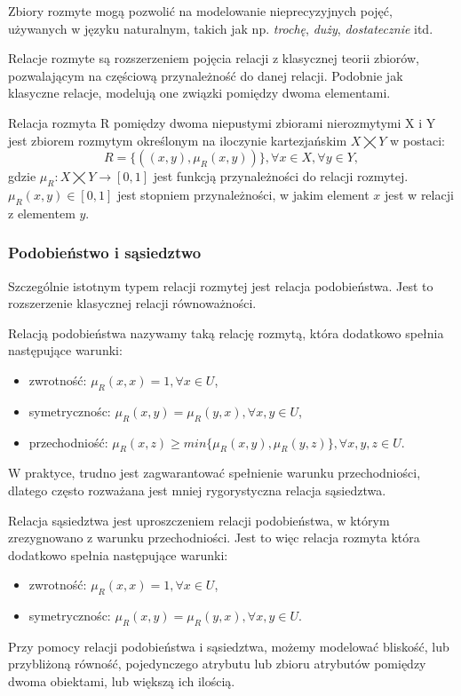 \documentclass{pracalicmgr}
\begin{document}
    Zbiory rozmyte mogą pozwolić na modelowanie nieprecyzyjnych pojęć, używanych w języku naturalnym, takich jak np.  \textit{trochę}, \textit{duży}, \textit{dostatecznie} itd.
    
    Relacje rozmyte są rozszerzeniem pojęcia relacji z klasycznej teorii zbiorów, pozwalającym na częściową przynależność do danej relacji. Podobnie jak klasyczne relacje, modelują one związki pomiędzy dwoma elementami. 
    \begin{defn}
        Relacja rozmyta R pomiędzy dwoma niepustymi zbiorami nierozmytymi X i Y jest zbiorem rozmytym określonym na iloczynie kartezjańskim $X \bigtimes Y$ w postaci:
        \begin{equation}
            \label{rel_rozm}
            R = \lbrace((x,y),\mu_R(x,y))\rbrace,\forall x \in X, \forall y \in Y,
        \end{equation}
        gdzie $\mu_R:X\bigtimes Y \rightarrow[0,1]$ jest funkcją przynależności do relacji rozmytej. $\mu_R(x,y) \in [0,1]$ jest stopniem przynależności, w jakim element $x$ jest w relacji z elementem $y$.
    \end{defn} 
     
    \subsubsection{Podobieństwo i sąsiedztwo} 
    Szczególnie istotnym typem relacji rozmytej jest relacja podobieństwa. Jest to rozszerzenie klasycznej relacji równoważności.
    \begin{defn}
        Relacją podobieństwa nazywamy taką relację rozmytą, która dodatkowo spełnia następujące warunki:
        \begin{itemize}
            \item zwrotność: $\mu_R(x,x) = 1, \forall x \in U$,
            \item symetrycznośc: $\mu_R(x,y) = \mu_R(y,x), \forall x,y \in U$,
            \item przechodniość: $\mu_R(x,z) \ge min\lbrace\mu_R(x,y),\mu_R(y,z)\rbrace,\forall x,y,z \in U$.
        \end{itemize}
    \end{defn}
    W praktyce, trudno jest zagwarantować spełnienie warunku przechodniości, dlatego często rozważana jest mniej rygorystyczna relacja sąsiedztwa.
    \begin{defn}
    Relacja sąsiedztwa jest uproszczeniem relacji podobieństwa, w którym zrezygnowano z warunku przechodniości. Jest to więc relacja rozmyta która dodatkowo spełnia następujące warunki:
    \begin{itemize}
        \item zwrotność: $\mu_R(x,x) = 1, \forall x \in U$,
        \item symetrycznośc: $\mu_R(x,y) = \mu_R(y,x), \forall x,y \in U$.
    \end{itemize}
    \end{defn}
    Przy pomocy relacji podobieństwa i sąsiedztwa, możemy modelować bliskość, lub przybliżoną równość, pojedynczego atrybutu lub zbioru atrybutów pomiędzy dwoma obiektami, lub większą ich ilością. 
      
\end{document}
